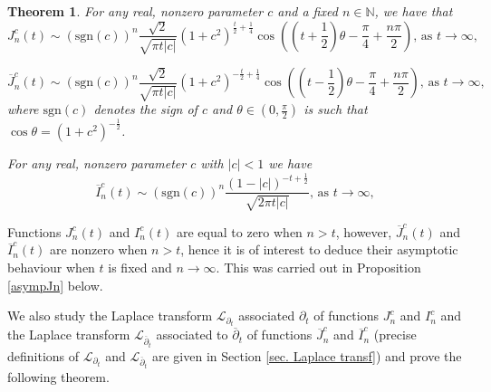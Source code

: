 \documentclass[12pt]{amsart}
\numberwithin{equation}{section}
\newtheorem{theorem}{Theorem}[section]
\begin{document}
\begin{theorem}
\label{th_asymp} For any real, nonzero parameter $c$ and a fixed $n\in
\mathbb{N} $, we have that%
\begin{equation}
J_{n}^{c}\left( t\right) \sim \left( \mathrm{sgn}(c)\right) ^{n}\frac{\sqrt{2%
}}{\sqrt{\pi t\left\vert c\right\vert }}\left( 1+c^{2}\right) ^{\frac{t}{2}+%
\frac{1}{4}}\cos \left( \left( t+\frac{1}{2}\right) \theta -\frac{\pi }{4}+%
\frac{n\pi }{2}\right) \text{, as }t\rightarrow \infty ,  \label{asymp1}
\end{equation}

\begin{equation}
\overline{J}_{n}^{c}\left( t\right) \sim \left( \mathrm{sgn}(c)\right) ^{n}%
\frac{\sqrt{2}}{\sqrt{\pi t\left\vert c\right\vert }}\left( 1+c^{2}\right)
^{-\frac{t}{2}+\frac{1}{4}}\cos \left( \left( t-\frac{1}{2}\right) \theta -%
\frac{\pi }{4}+\frac{n\pi }{2}\right) \text{, as }t\rightarrow \infty ,
\label{asymp2}
\end{equation}
where $\mathrm{sgn}(c)$ denotes the sign of $c$ and $\theta\in\left(0,\frac{\pi}{2}\right)$ is such that $\cos \theta =\left( 1+c^{2}\right) ^{-\frac{1}{2}}$.

For any real, nonzero parameter $c$ with $|c|<1$ we have
\begin{equation}
\overline{I}_{n}^{c}\left( t\right) \sim \left( \mathrm{sgn}(c)\right) ^{n}%
\frac{\left( 1-\left\vert c\right\vert \right) ^{-t+\frac{1}{2}}}{\sqrt{2\pi
t\left\vert c\right\vert }}\text{, as }t\rightarrow \infty ,  \label{asymp3}
\end{equation}
\end{theorem}

Functions $J_{n}^{c}\left( t\right)$ and $I_{n}^{c}\left( t\right) $ are equal to zero when $n>t$, however, $\overline{J}_{n}^{c}\left( t\right)$ and $\overline{I}_{n}^{c}\left( t\right)$ are nonzero when $n>t$, hence it is of interest to deduce their asymptotic behaviour when $t$ is fixed and $n\to \infty$. This was carried out in Proposition \ref{asympJn} below.

\medskip

We also study the Laplace transform $\mathcal{L}_{\partial_t}$ associated  $\partial_t$ of functions $J_n^c$ and $I_n^c$  and the Laplace transform $\mathcal{L}_{\overline{\partial}_t}$ associated to $\overline{\partial}_t$ of functions $\overline{J}_{n}^{c}$ and $\overline{I}_{n}^{c}$ (precise definitions of $\mathcal{L}_{\partial_t}$ and $\mathcal{L}_{\overline{\partial}_t}$ are given in Section \ref{sec.
Laplace transf}) and prove the following theorem.
\end{document}
